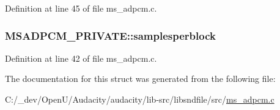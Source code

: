 Definition at line 45 of file ms\+\_\+adpcm.\+c.

\subsubsection[{\texorpdfstring{samplesperblock}{samplesperblock}}]{ M\+S\+A\+D\+P\+C\+M\+\_\+\+P\+R\+I\+V\+A\+T\+E\+::samplesperblock}\hypertarget{struct_m_s_a_d_p_c_m___p_r_i_v_a_t_e_a8716eff02e0112009cf164b88300e378}{}\label{struct_m_s_a_d_p_c_m___p_r_i_v_a_t_e_a8716eff02e0112009cf164b88300e378}


Definition at line 42 of file ms\+\_\+adpcm.\+c.



The documentation for this struct was generated from the following file\+:\begin{DoxyCompactItemize}
\item 
C\+:/\+\_\+dev/\+Open\+U/\+Audacity/audacity/lib-\/src/libsndfile/src/\hyperlink{ms__adpcm_8c}{ms\+\_\+adpcm.\+c}\end{DoxyCompactItemize}
